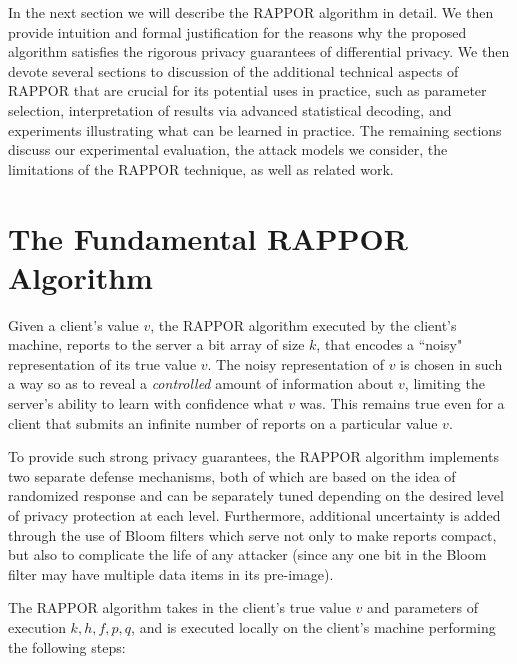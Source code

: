 \documentclass{sig-alternate-2013}
\newcommand\RAPPOR{{RAPPOR}}
\begin{document}
In the next section we will describe the \RAPPOR{} algorithm in detail. We then provide intuition and formal justification for the reasons why the proposed algorithm satisfies the rigorous privacy guarantees of differential privacy. We then devote several sections to discussion of the additional technical aspects of \RAPPOR{} that are crucial for its potential uses in practice, such as parameter selection, interpretation of results via advanced statistical decoding, and experiments illustrating what can be learned in practice. The remaining sections discuss our experimental evaluation, the attack models we consider, the limitations of the \RAPPOR{} technique, as well as related work.


\section{The Fundamental \RAPPOR{} Algorithm}
Given a client's value $v$, the \RAPPOR{} algorithm executed by the client's machine, reports to the server a bit array of size $k$, that encodes a ``noisy" representation of its true value $v$. The noisy representation of $v$ is chosen in such a way so as to reveal a \emph{controlled} amount of information about $v$, limiting the server's ability to learn with confidence what $v$ was. This remains true even for a client that submits an infinite number of reports on a particular value $v$.

To provide such strong privacy guarantees, the \RAPPOR{} algorithm implements two separate defense mechanisms, both of which are based on the idea of randomized response and can be separately tuned depending on the desired level of privacy protection at each level. 
Furthermore, additional uncertainty is added through the use of Bloom filters which serve not only to make reports compact, but also to complicate the life of any attacker (since any one bit in the Bloom filter may have multiple data items in its pre-image).

The \RAPPOR{} algorithm takes in the client's true value $v$ and parameters of execution $k, h, f, p, q$, and is executed locally on the client's machine performing the following steps:
\end{document}
